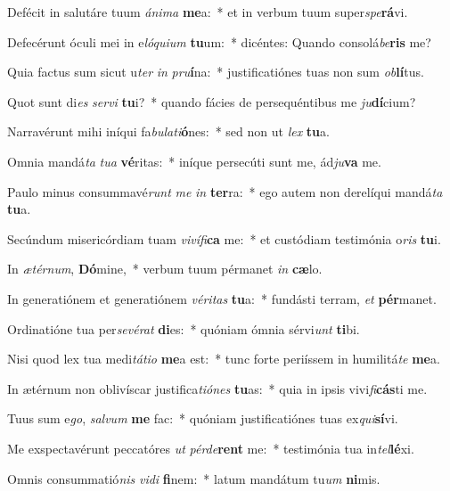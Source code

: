 \item Defécit in salutáre tuum \textit{á}\textit{ni}\textit{ma} \textbf{me}a:~* et in verbum tuum super\textit{spe}\textbf{rá}vi.
\item Defecérunt óculi mei in e\textit{ló}\textit{qui}\textit{um} \textbf{tu}um:~* dicéntes: Quando consolá\textit{be}\textbf{ris} me?
\item Quia factus sum sicut u\textit{ter} \textit{in} \textit{pru}\textbf{í}na:~* justificatiónes tuas non sum \textit{ob}\textbf{lí}tus.
\item Quot sunt di\textit{es} \textit{ser}\textit{vi} \textbf{tu}i?~* quando fácies de persequéntibus me \textit{ju}\textbf{dí}cium?
\item Narravérunt mihi iníqui fa\textit{bu}\textit{la}\textit{ti}\textbf{ó}nes:~* sed non ut \textit{lex} \textbf{tu}a.
\item Omnia mandá\textit{ta} \textit{tu}\textit{a} \textbf{vé}ritas:~* iníque persecúti sunt me, ád\textit{ju}\textbf{va} me.
\item Paulo minus consummavé\textit{runt} \textit{me} \textit{in} \textbf{ter}ra:~* ego autem non derelíqui mandá\textit{ta} \textbf{tu}a.
\item Secúndum misericórdiam tuam \textit{vi}\textit{ví}\textit{fi}\textbf{ca} me:~* et custódiam testimónia o\textit{ris} \textbf{tu}i.
\item In \textit{æ}\textit{tér}\textit{num}, \textbf{Dó}mine,~* verbum tuum pérmanet \textit{in} \textbf{cæ}lo.
\item In generatiónem et generatiónem \textit{vé}\textit{ri}\textit{tas} \textbf{tu}a:~* fundásti terram, \textit{et} \textbf{pér}manet.
\item Ordinatióne tua per\textit{se}\textit{vé}\textit{rat} \textbf{di}es:~* quóniam ómnia sérvi\textit{unt} \textbf{ti}bi.
\item Nisi quod lex tua medi\textit{tá}\textit{ti}\textit{o} \textbf{me}a est:~* tunc forte periíssem in humilitá\textit{te} \textbf{me}a.
\item In ætérnum non oblivíscar justifica\textit{ti}\textit{ó}\textit{nes} \textbf{tu}as:~* quia in ipsis vivi\textit{fi}\textbf{cás}ti me.
\item Tuus sum e\textit{go}, \textit{sal}\textit{vum} \textbf{me} fac:~* quóniam justificatiónes tuas ex\textit{qui}\textbf{sí}vi.
\item Me exspectavérunt peccatóres \textit{ut} \textit{pér}\textit{de}\textbf{rent} me:~* testimónia tua in\textit{tel}\textbf{lé}xi.
\item Omnis consummatió\textit{nis} \textit{vi}\textit{di} \textbf{fi}nem:~* latum mandátum tu\textit{um} \textbf{ni}mis.

